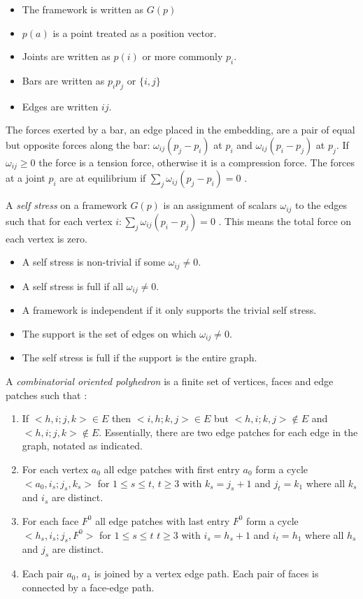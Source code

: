 \documentclass[11pt]{article}
\begin{document}
\begin{itemize}
	\item The framework is written as $G(p)$
	\item $p(a)$ is a point treated as a position vector. 
	\item Joints are written as $p(i)$ or more commonly $p_i$.
	\item Bars are written as $p_ip_j$ or $\{i,j\}$
	\item Edges are written $ij$.
\end{itemize}

The forces exerted by a bar, an edge placed in the embedding, are a pair of equal but opposite forces along the bar: $\omega_{ij}(p_j - p_i)$ at $p_i$ and $\omega_{ij}(p_i - p_j)$ at $p_j$. If $\omega_{ij} \geq 0$ the force is a tension force, otherwise it is a compression force. The forces at a joint $p_i$ are at equilibrium if $\sum_j \omega_{ij}(p_j-p_i) = 0$ \cite{mccProof}.

A \emph{self stress} on a framework $G(p)$ is an assignment of scalars $\omega_{ij}$ to the edges such that for each vertex $i : \sum_j \omega_{ij}(p_i - p_j) = 0$ \cite{mccProof}. This means the total force on each vertex is zero. 
\begin{itemize}
	\item A self stress is non-trivial if some $\omega_{ij} \neq 0$.
	\item A self stress is full if all $\omega_{ij} \neq 0$.
	\item A framework is independent if it only supports the trivial self stress.
	\item The support is the set of edges on which $\omega_{ij} \neq 0$.
	\item The self stress is full if the support is the entire graph.
\end{itemize}

A \emph{combinatorial oriented polyhedron} is a finite set of vertices, faces and edge patches such that \cite{mccProof}:
\begin{enumerate}
	\item If $<h,i;j,k> \in E$ then $<i,h;k,j> \in E$ but $<h,i;k,j> \not\in E$ and $<h,i;j,k> \not\in E$. Essentially, there are two edge patches for each edge in the graph, notated as indicated.
	\item For each vertex $a_0$ all edge patches with first entry $a_0$ form a cycle $<a_0,i_s;j_s,k_s>$ for $1\leq s \leq t$, $t\geq3$ with $k_s = j_s + 1$ and $j_t = k_1$ where all $k_s$ and $i_s$ are distinct. 
	\item For each face $F^0$ all edge patches with last entry $F^0$ form a cycle $<h_s, i_s;j_s,F^0>$ for $1\leq s \leq t$ $t\geq3$ with $i_s = h_s + 1$ and $i_t = h_1$ where all $h_s$ and $j_s$ are distinct.
	\item Each pair $a_0$, $a_1$ is joined by a vertex edge path. Each pair of faces is connected by a face-edge path. 
\end{enumerate}
\end{document}
